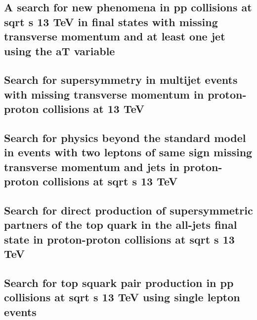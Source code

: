 \documentclass[a4paper, 11pt, twoside, openright]{report}
\begin{document}
\subsection{A search for new phenomena in pp collisions at sqrt s 13 TeV in final states with missing transverse momentum and at least one jet using the aT variable}


\subsection{Search for supersymmetry in multijet events with missing transverse momentum in proton-proton collisions at 13 TeV}


\subsection{Search for physics beyond the standard model in events with two leptons of same sign missing transverse momentum and jets in proton-proton collisions at sqrt s 13 TeV}


\subsection{Search for direct production of supersymmetric partners of the top quark in the all-jets final state in proton-proton collisions at sqrt s 13 TeV}


\subsection{Search for top squark pair production in pp collisions at sqrt s 13 TeV using single lepton events}

\end{document}
